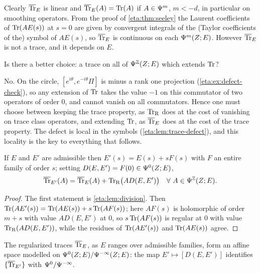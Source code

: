 Clearly $\overline{\operatorname{Tr}}_E$ is linear and $\overline{\operatorname{Tr}}_E(A)=\operatorname{Tr}(A)$ if $A\in\Psi^{m}$, $m<-d$, in
particular on smoothing operators. From the proof of \cref{eta:thm:seeley} the
Laurent coefficients of $\operatorname{Tr}(AE(s))$ at $s=0$ are given by convergent integrals of
the (Taylor coefficients of the) symbol of $AE(s)$, so $\overline{\operatorname{Tr}}_E$ is continuous on
each $\Psi^{m}(Z;E)$. However $\overline{\operatorname{Tr}}_E$ is not a trace, and it depends on $E$.

\begin{question}
  Is there a better choice: a trace on all of $\Psi^{\mathbb{Z}}(Z;E)$ which extends
  $\operatorname{Tr}$?
\end{question}
\begin{answer}
  No. On the circle, $[e^{i\theta},e^{-i\theta}\Pi]$ is minus a rank one projection
  (\cref{eta:ex:defect-check}), so any extension of $\operatorname{Tr}$ takes the value $-1$ on
  this commutator of two operators of order $0$, and cannot vanish on all
  commutators. Hence one must choose between keeping the trace property, as $\operatorname{Tr}_{\mathrm{R}}$
  does at the cost of vanishing on trace class operators, and extending $\operatorname{Tr}$, as
  $\overline{\operatorname{Tr}}_E$ does at the cost of the trace property. The defect is local in the
  symbols (\cref{eta:lem:trace-defect}), and this locality is the key to everything
  that follows.
\end{answer}

\begin{lemma}\label{eta:lem:reg-dependence}
If $E$ and $E'$ are admissible then $E'(s)=E(s)+sF(s)$ with $F$ an entire family of
order $s$; setting $D(E,E')=F(0)\in\Psi^{0}(Z;E)$,
\[
\Trbar_{E'}(A)=\Trbar_E(A)+\TrR\bigl(AD(E,E')\bigr)\quad\forall\ A\in\Psido{\Z}(Z;E).
\]
\end{lemma}

\begin{proof} The first statement is \cref{eta:lem:division}. Then
$\operatorname{Tr}(AE'(s))=\operatorname{Tr}(AE(s))+s\operatorname{Tr}(AF(s))$; here $AF(s)$ is holomorphic of order $m+s$
with value $AD(E,E')$ at $0$, so $s\operatorname{Tr}(AF(s))$ is regular at $0$ with value
$\operatorname{Tr}_{\mathrm{R}}(AD(E,E'))$, while the residues of $\operatorname{Tr}(AE'(s))$ and $\operatorname{Tr}(AE(s))$ agree.
\end{proof}

\begin{proposition}\label{eta:prop:affine}
The regularized traces $\overline{\operatorname{Tr}}_E$, as $E$ ranges over admissible families, form an
affine space modelled on $\Psi^{0}(Z;E)/\Psi^{-\infty}(Z;E)$: the map
$E'\longmapsto[D(E,E')]$ identifies $\{\overline{\operatorname{Tr}}_{E'}\}$ with
$\Psi^{0}/\Psi^{-\infty}$.
\end{proposition}

